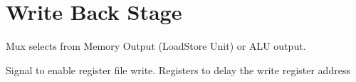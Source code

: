 \chapter{Write Back Stage}

Mux selects from Memory Output (LoadStore Unit) or ALU output.

Signal to enable register file write.
Registers to delay the write register address